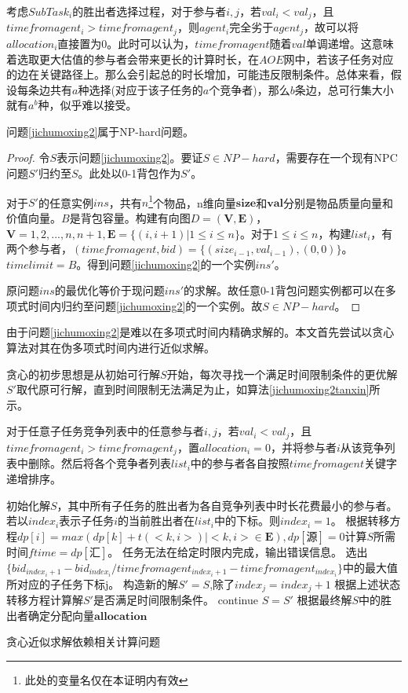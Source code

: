 \documentclass[promaster]{thesis-uestc}
\begin{document}
考虑$SubTask_i$的胜出者选择过程，对于参与者$i,j$，若$val_i < val_j$，且$timefromagent_i > timefromagent_j$，则$agent_i$完全劣于$agent_j$，故可以将$allocation_i$直接置为0。此时可以认为，$timefromagent$随着$val$单调递增。这意味着选取更大估值的参与者会带来更长的计算时长，在$AOE$网中，若该子任务对应的边在关键路径上。那么会引起总的时长增加，可能违反限制条件。总体来看，假设每条边共有$a$种选择(对应于该子任务的$a$个竞争者)，那么$b$条边，总可行集大小就有$a^b$种，似乎难以接受。

\begin{theorem}
   问题\ref{jichumoxing2}属于NP-hard问题。
\end{theorem}

\begin{proof}
    令$S$表示问题\ref{jichumoxing2}。要证$S\in NP-hard$，需要存在一个现有NPC问题$S'$归约至$S$。此处以0-1背包作为$S'$。

    对于$S'$的任意实例$ins$，共有$n$\footnote{此处的变量名仅在本证明内有效}个物品，n维向量$\mathbf{size}$和$\mathbf{val}$分别是物品质量向量和价值向量。$B$是背包容量。构建有向图$D=(\mathbf{V},\mathbf{E})$，$\mathbf{V} = {1,2,...,n,n+1},\mathbf{E} = \{(i,i+1)|1 \leq i \leq n\}$。对于$1 \leq i \leq n$，构建$list_i$，有两个参与者，$(timefromagent,bid) = \{(size_{i-1},val_{i-1}),(0,0)\}$。$timelimit = B$。得到问题\ref{jichumoxing2}的一个实例$ins'$。

    原问题$ins$的最优化等价于现问题$ins'$的求解。故任意0-1背包问题实例都可以在多项式时间内归约至问题\ref{jichumoxing2}的一个实例。故$S\in NP-hard$。
\end{proof}

由于问题\ref{jichumoxing2}是难以在多项式时间内精确求解的。本文首先尝试以贪心算法对其在伪多项式时间内进行近似求解。

贪心的初步思想是从初始可行解$S$开始，每次寻找一个满足时间限制条件的更优解$S'$取代原可行解，直到时间限制无法满足为止，如算法\ref{jichumoxing2tanxin}所示。

\begin{algorithm}[h]
    对于任意子任务竞争列表中的任意参与者$i,j$，若$val_i < val_j$，且$timefromagent_i > timefromagent_j$，置$allocation_i = 0$，并将参与者$i$从该竞争列表中删除。然后将各个竞争者列表$list_i$中的参与者各自按照$timefromagent$关键字递增排序。\;

    初始化解$S$，其中所有子任务的胜出者为各自竞争列表中时长花费最小的参与者。\;
    若以$index_i$表示子任务$i$的当前胜出者在$list_i$中的下标。则$index_i = 1$。\;
    根据转移方程$dp[i] = max(dp[k]+t(<k,i>)|<k,i> \in \mathbf{E}),dp[\text{源}] = 0$计算$S$所需时间$ftime = dp[\text{汇}]$。\;
    {
        任务无法在给定时限内完成，输出错误信息。\;
    }
    {
        选出$\{bid_{index_i+1}-bid_{index_i}/timefromagent_{index_i+1}-timefromagent_{index_i}\}$中的最大值所对应的子任务下标j。\;
        构造新的解$S' = S$,除了$index_j = index_j+1$\;
        根据上述状态转移方程计算解$S'$是否满足时间限制条件。\;
        {
            continue\;
        }
        $S = S'$\;
    } 
    根据最终解$S$中的胜出者确定分配向量$\mathbf{allocation}$\;
\caption{贪心近似求解依赖相关计算问题}
\label{jichumoxing2tanxin}
\end{algorithm}
\end{document}
